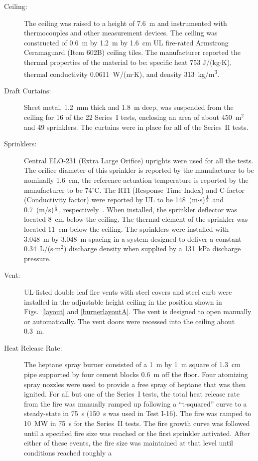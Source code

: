 \begin{description}
\item[Ceiling:] The ceiling was raised to a height of 7.6~m and instrumented with thermocouples and other measurement devices. The ceiling was constructed of
0.6~m by 1.2~m by 1.6~cm UL fire-rated Armstrong Ceramaguard (Item 602B) ceiling tiles. The manufacturer reported the
thermal properties of the material to be: specific heat 753 J/(kg$\cdot$K), thermal conductivity
0.0611~W/(m$\cdot$K), and density 313~\unit{kg/m^3}.
\item[Draft Curtains:] Sheet metal, 1.2~mm thick and 1.8~m deep, was suspended from the ceiling for 16 of the 22 Series~I tests, enclosing an area of about 450~m$^2$ and 49 sprinklers.
The curtains were in place for all of the Series~II tests.
\item[Sprinklers:] Central ELO-231 (Extra Large Orifice) uprights were used for all the tests. The orifice diameter of this sprinkler is reported by the manufacturer to be nominally 1.6~cm, the reference actuation temperature is reported by the manufacturer to be 74$^\circ$C. The RTI (Response Time Index) and C-factor (Conductivity factor) were reported by UL to be 148~(m$\cdot$s)$^{\frac{1}{2}}$ and 0.7~(m/s)$^{\frac{1}{2}}$, respectively~\cite{Sheppard:1}. When installed, the sprinkler deflector was located 8~cm below the ceiling. The thermal element of the sprinkler was located 11~cm below the ceiling. The sprinklers were installed with 3.048~m by 3.048~m spacing in a system designed to deliver a constant 0.34~L/(s$\cdot$m$^2$) discharge density when supplied by a 131~kPa discharge pressure.
\item[Vent:] UL-listed double leaf fire vents with steel covers and steel curb were installed in the adjustable height ceiling in the position shown in Figs.~\ref{layout} and \ref{burnerlayoutA}. The vent is designed to open manually or automatically. The vent doors were recessed into the ceiling about 0.3~m.
\item[Heat Release Rate:] The heptane spray burner consisted of a 1~m by 1~m square of 1.3~cm pipe supported by four cement blocks 0.6~m off the floor.
Four atomizing spray nozzles were used to provide a free spray of heptane that was then ignited. For all but one of the Series~I tests, the total heat release
rate from the fire was manually ramped up following a ``t-squared'' curve to a steady-state in 75~s
(150~s was used in Test I-16). The fire was ramped to 10~MW in 75~s for the Series~II tests. The fire growth curve was followed until a specified fire size was
reached or the first sprinkler activated. After either of these events, the fire size was maintained at that level until conditions reached roughly a

\end{description}
